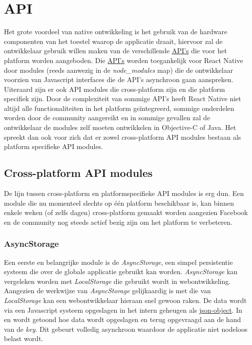 	\section{API}
Het grote voordeel van native ontwikkeling is het gebruik van de hardware componenten van het toestel waarop de applicatie draait, hiervoor zal de ontwikkelaar gebruik willen maken van de verschillende \hyperref[api]{API's} die voor het platform worden aangeboden. Die \hyperref[api]{API's} worden toegankelijk voor React Native door modules (reeds aanwezig in de \emph{node\_modules} map) die de ontwikkelaar voorzien van Javascript interfaces die de API's asynchroon gaan aanspreken. Uiteraard zijn er ook API modules die cross-platform zijn en die platform specifiek zijn. Door de complexiteit van sommige API's heeft React Native niet altijd alle functionaliteiten in het platform geïntegreerd, sommige onderdelen worden door de community aangereikt en in sommige gevallen zal de ontwikkelaar de modules zelf moeten ontwikkelen in Objective-C of Java. Het spreekt dan ook voor zich dat er zowel cross-platform API modules bestaan als platform specifieke API modules.
 
\subsection{Cross-platform API modules}
De lijn tussen cross-platform en platformspecifieke API modules is erg dun. Een module die nu momenteel slechts op één platform beschikbaar is, kan binnen enkele weken (of zelfs dagen) cross-platform gemaakt worden aangezien Facebook en de community nog steeds actief bezig zijn om het platform te verbeteren. 
\subsubsection{AsyncStorage}
Een eerste en belangrijke module is de \emph{AsyncStorage}, een simpel persistentie systeem die over de globale applicatie gebruikt kan worden. \emph{AsyncStorage} kan vergeleken worden met \emph{LocalStorage} die gebruikt wordt in webontwikkeling. Aangezien de werkwijze van \emph{AsyncStorage} gelijkaardig is met die van \emph{LocalStorage} kan een webontwikkelaar hieraan snel gewoon raken. De data wordt via een Javascript systeem opgeslagen in het intern geheugen als \hyperref[json]{json-object}. In  en  wordt getoond hoe data wordt opgeslagen en terug opgevraagd aan de hand van de \emph{key}. Dit gebeurt volledig asynchroon waardoor de applicatie niet nodeloos belast wordt. 

